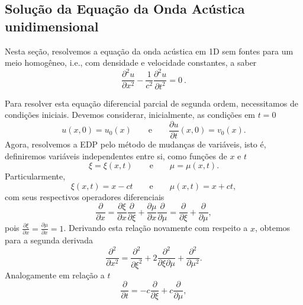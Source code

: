 \subsection{Solu\c{c}\~ao da Equa\c{c}\~ao da Onda Ac\'ustica
unidimensional}

Nesta se\c{c}\~ao, resolvemos a equa\c{c}\~ao da onda ac\'ustica em 1D
sem fontes para um meio homog\^eneo, i.e., com densidade e velocidade
constantes, a saber
\begin{equation}
\frac{\partial^2 u}{\partial x^2} - \frac{1}{c^2}
\frac{\partial^2 u}{\partial t^2} = 0 \ .
\label{ondaacu1d}
\end{equation}

Para resolver esta equa\c{c}\~ao diferencial parcial de segunda
ordem, necessitamos de condi\c{c}\~oes iniciais.
Devemos considerar, inicialmente, as condi\c{c}\~oes em $t=0$
\begin{equation}
u(x,0)=u_0 (x) \qquad \mbox{e}\qquad  \frac{\partial u}{\partial t}(x,0)=v_0 (x).
\end{equation}
Agora, resolvemos a EDP pelo m\'etodo de mudan\c{c}as de vari\'aveis,
isto \'e, definiremos vari\'aveis independentes entre si, como
fun\c{c}\~oes de $x$ e $t$
\begin{equation}
 \xi =\xi (x,t) \qquad\mbox{e}\qquad \mu =\mu (x,t).
\end{equation}
Particularmente,
\begin{equation}
 \xi (x,t)=x-ct \qquad\mbox{e}\qquad \mu (x,t)=x+ct,
\end{equation}
com seus respectivos operadores diferenciais
\begin{equation}
 \frac{\partial}{\partial x}=\frac{\partial \xi}{\partial x}\frac{\partial}{\partial  \xi}+
\frac{\partial \mu}{\partial x}\frac{\partial}{\partial \mu}=\frac{\partial}{\partial  \xi}+
\frac{\partial}{\partial \mu},
\end{equation}
pois $\frac{\partial \xi}{\partial x}=\frac{\partial \mu}{\partial x}=1$.
Derivando esta rela\c{c}\~ao novamente com respeito a $x$, obtemos para
a segunda derivada
\begin{equation}\label{opx}
 \frac{\partial ^2}{\partial x^2}=\frac{\partial ^2}{\partial \xi ^2}+2\frac{\partial  ^2}
{\partial \xi \partial \mu}+\frac{\partial ^2}{\partial \mu ^2}.
\end{equation}
Analogamente em rela\c{c}\~ao a $t$
\begin{equation}
 \frac{\partial}{\partial t}=-c\frac{\partial}{\partial \xi}+c\frac{\partial}{\partial \mu},
\end{equation}

